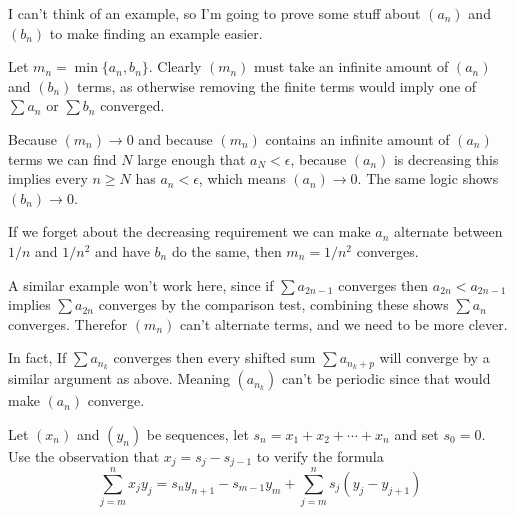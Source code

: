 \begin{solution}
  I can't think of an example, so I'm going to prove some stuff about $(a_n)$ and $(b_n)$ to make finding an example easier.

  Let $m_n = \min\{a_n, b_n\}$.
  Clearly $(m_n)$ must take an infinite amount of $(a_n)$ and $(b_n)$ terms, as otherwise removing the finite terms would imply one of $\sum a_n$ or $\sum b_n$ converged.

  Because $(m_n) \to 0$ and because $(m_n)$ contains an infinite amount of $(a_n)$ terms we can find $N$ large enough that $a_N < \epsilon$, because $(a_n)$ is decreasing this implies every $n \ge N$ has $a_n < \epsilon$, which means $(a_n) \to 0$. The same logic shows $(b_n) \to 0$.

  If we forget about the decreasing requirement we can make $a_n$ alternate between $1/n$ and $1/n^2$ and have $b_n$ do the same, then $m_n = 1/n^2$ converges.

  A similar example won't work here, since if $\sum a_{2n-1}$ converges then $a_{2n} < a_{2n-1}$ implies $\sum a_{2n}$ converges by the comparison test, combining these shows $\sum a_n$ converges. Therefor $(m_n)$ can't alternate terms, and we need to be more clever.

  In fact, If $\sum a_{n_k}$ converges then every shifted sum $\sum a_{n_k+p}$ will converge by a similar argument as above. Meaning $\left(a_{n_k}\right)$ can't be periodic since that would make $(a_n)$ converge.

  \TODO

\end{solution}

\begin{exercise}
  Let $\left(x_{n}\right)$ and $\left(y_{n}\right)$ be sequences, let $s_{n}=x_{1}+x_{2}+\cdots+x_{n}$ and set $s_{0}=0 .$ Use the observation that $x_{j}=s_{j}-s_{j-1}$ to verify the formula
  $$
  \sum_{j=m}^{n} x_{j} y_{j}=s_{n} y_{n+1}-s_{m-1} y_{m}+\sum_{j=m}^{n} s_{j}\left(y_{j}-y_{j+1}\right)
  $$
\end{exercise}

